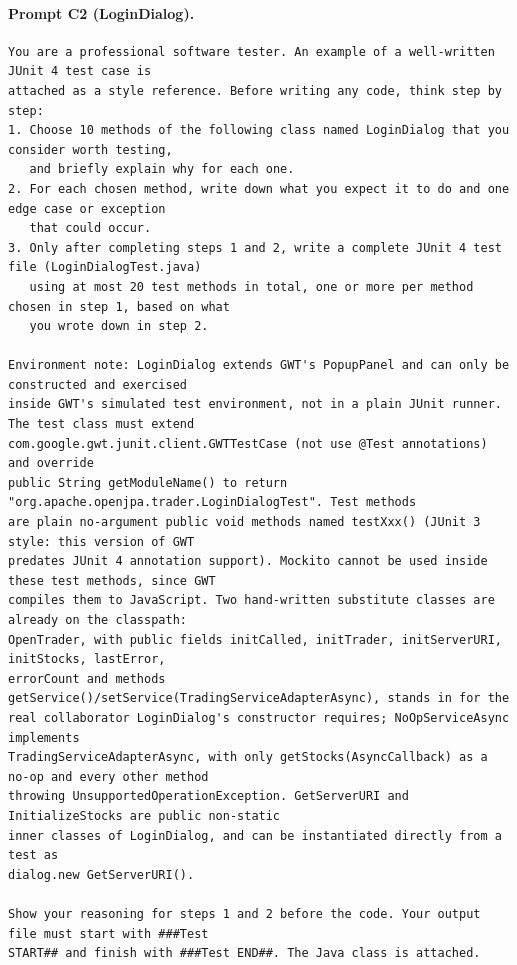 \paragraph*{Prompt C2 (LoginDialog).}
\label{prompt:ld-c2}
\begin{lstlisting}
You are a professional software tester. An example of a well-written JUnit 4 test case is
attached as a style reference. Before writing any code, think step by step:
1. Choose 10 methods of the following class named LoginDialog that you consider worth testing,
   and briefly explain why for each one.
2. For each chosen method, write down what you expect it to do and one edge case or exception
   that could occur.
3. Only after completing steps 1 and 2, write a complete JUnit 4 test file (LoginDialogTest.java)
   using at most 20 test methods in total, one or more per method chosen in step 1, based on what
   you wrote down in step 2.

Environment note: LoginDialog extends GWT's PopupPanel and can only be constructed and exercised
inside GWT's simulated test environment, not in a plain JUnit runner. The test class must extend
com.google.gwt.junit.client.GWTTestCase (not use @Test annotations) and override
public String getModuleName() to return "org.apache.openjpa.trader.LoginDialogTest". Test methods
are plain no-argument public void methods named testXxx() (JUnit 3 style: this version of GWT
predates JUnit 4 annotation support). Mockito cannot be used inside these test methods, since GWT
compiles them to JavaScript. Two hand-written substitute classes are already on the classpath:
OpenTrader, with public fields initCalled, initTrader, initServerURI, initStocks, lastError,
errorCount and methods getService()/setService(TradingServiceAdapterAsync), stands in for the
real collaborator LoginDialog's constructor requires; NoOpServiceAsync implements
TradingServiceAdapterAsync, with only getStocks(AsyncCallback) as a no-op and every other method
throwing UnsupportedOperationException. GetServerURI and InitializeStocks are public non-static
inner classes of LoginDialog, and can be instantiated directly from a test as
dialog.new GetServerURI().

Show your reasoning for steps 1 and 2 before the code. Your output file must start with ###Test
START## and finish with ###Test END##. The Java class is attached.
\end{lstlisting}

